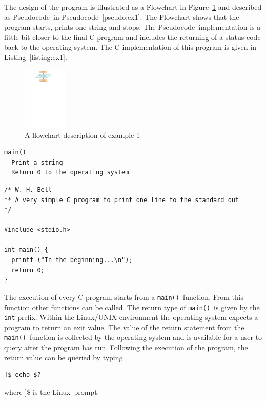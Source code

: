 \documentclass[11pt]{scrartcl}
\def\main{\texttt{main()}}
\def\psc{Pseudocode}
\def\linux{Linux}
\begin{document}
The design of the program is illustrated as a Flowchart in Figure~\ref{figure:flowchart_ex1} and described as \psc\ in \psc~\ref{pseudo:ex1}.  The Flowchart shows that the program starts, prints one string and stops.  The \psc\ implementation is a little bit closer to the final C program and includes the returning of a status code back to the operating system.  The C implementation of this program is given  
in Listing~\ref{listing:ex1}.

\begin{figure}[h]
\begin{center}
\includegraphics[height=3cm]{figures/ex1}
\caption{A flowchart description of example 1
\label{figure:flowchart_ex1}}
\end{center}
\end{figure}

\begin{pseudocode}[h]
\begin{verbatim}
main()
  Print a string
  Return 0 to the operating system
\end{verbatim}
\caption{A pseudocode description of example 1\label{pseudo:ex1}}
\end{pseudocode}

\begin{program}[H]
\begin{lstlisting}
/* W. H. Bell
** A very simple C program to print one line to the standard out
*/

#include <stdio.h>

int main() {
  printf ("In the beginning...\n");
  return 0;
}
\end{lstlisting}
\caption{The C implementation of example 1 \label{listing:ex1}}
\end{program}

The execution of every C program starts from a \main\ function.  From this function other functions can be called.  The return type of \main\ is given by the \texttt{int} prefix.  Within the \linux/UNIX environment the operating system expects a program to return an exit value.  The value of the return statement from the \main\ function is collected by the operating system and is available for a user to query after the program has run.  Following the execution of the program, the return value can be queried by typing
\begin{verbatim}
]$ echo $?
\end{verbatim}
where \texttt{$]\$$} is the \linux\ prompt.
\end{document}
